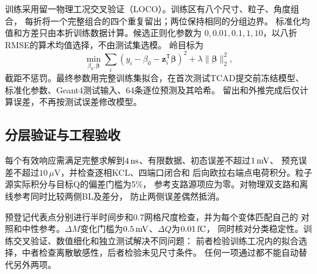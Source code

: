 训练采用留一物理工况交叉验证（LOCO）。训练区有八个尺寸、粒子、角度组合，
每折将一个完整组合的四个重复留出；两位保持相同的分组边界。
标准化均值和方差只由本折训练数据计算。候选正则化参数为
$0,0.01,0.1,1,10$，以八折RMSE的算术均值选择，不由测试集选模。
岭目标为
\begin{equation}
\min_{\beta_0,\boldsymbol\beta}
\sum_i(y_i-\beta_0-\boldsymbol z_i^{\mathsf T}\boldsymbol\beta)^2
+\lambda\|\boldsymbol\beta\|_2^2,
\end{equation}
截距不惩罚。最终参数用完整训练集拟合，在首次测试TCAD提交前冻结模型、
标准化参数、Geant4测试输入、64条逐位预测及其哈希。
留出和外推完成后仅计算误差，不再按测试误差修改模型。

\subsection{分层验证与工程验收}
每个有效响应需满足完整求解到$4\,\mathrm{ns}$、有限数据、初态误差不超过$1\,\mathrm{mV}$、
预充误差不超过$10\,\mu\mathrm{V}$，并检查逐相KCL、四端口闭合和
后向欧拉右端点电荷积分。粒子源实际积分与目标Q的偏差门槛为5\%，
参考支路源项应为零。对物理双支路和离线参考同时比较两侧BL及差分，
防止两侧误差偶然抵消。

预登记代表点分别进行半时间步和0.7网格尺度检查，并为每个变体匹配自己的
对照和中性参考。$\Delta M$变化门槛为$0.5\,\mathrm{mV}$、$\Delta Q$为$0.01\,\mathrm{fC}$，
同时核对分类稳定性。训练交叉验证、数值细化和独立测试解决不同问题：
前者检验训练工况内的拟合选择，中者检查离散敏感性，后者检验未见尺寸条件。
任何一项通过都不能自动替代另外两项。
